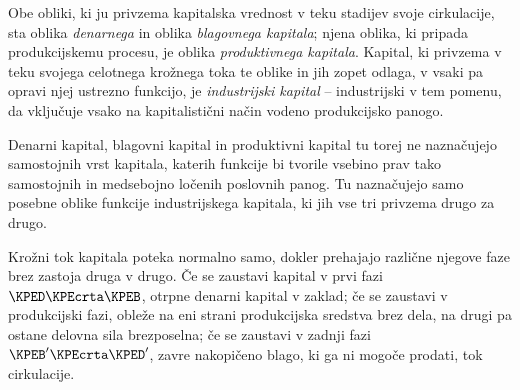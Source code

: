\documentclass[kapital_02.tex]{subfiles}
\begin{document}
Obe obliki, ki ju privzema kapitalska vrednost v teku stadijev svoje cirkulacije, sta oblika \emph{denarnega} in oblika \emph{blagovnega kapitala}; njena oblika, ki pripada produkcijskemu procesu, je oblika \emph{produktivnega kapitala}. Kapital, ki privzema v teku svojega celotnega krožnega toka te oblike in jih zopet odlaga, v vsaki pa opravi njej ustrezno funkcijo, je \emph{industrijski kapital} -- industrijski v tem pomenu, da vključuje vsako na kapitalistični način vodeno produkcijsko panogo.

Denarni kapital, blagovni kapital in produktivni kapital tu torej ne naznačujejo samostojnih vrst kapitala, katerih funkcije \KPEstran bi tvorile vsebino prav tako samostojnih in medsebojno ločenih poslovnih panog. Tu naznačujejo samo posebne oblike funkcije industrijskega kapitala, ki jih vse tri privzema drugo za drugo.

Krožni tok kapitala poteka normalno samo, dokler prehajajo različne njegove faze brez zastoja druga v drugo. Če se zaustavi kapital v prvi fazi \(\KPED\KPEcrta\KPEB\), otrpne denarni kapital v zaklad; če se zaustavi v produkcijski fazi, obleže na eni strani produkcijska sredstva brez dela, na drugi pa ostane delovna sila brezposelna; če se zaustavi v zadnji fazi \(\KPEB'\KPEcrta\KPED'\), zavre nakopičeno blago, ki ga ni mogoče prodati, tok cirkulacije.
\end{document}
